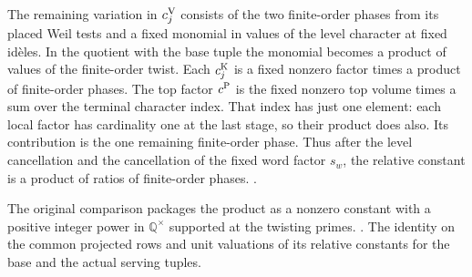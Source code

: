 The remaining variation in \(c^{\rm V}_j\) consists of the
two finite-order phases from its placed Weil tests and a fixed
monomial in values of the level character at fixed id\`eles.
In the quotient with the base tuple the monomial becomes a
product of values of the finite-order twist. Each \(c^{\rm K}_j\)
is a fixed nonzero factor times a product of finite-order
phases. The top factor \(c^{\rm P}\) is the fixed nonzero top
volume times a sum over the terminal character index. That index
has just one element: each local factor has cardinality one at
the last stage, so their product does also. Its contribution is
the one remaining finite-order phase. Thus after the level
cancellation and the cancellation of the fixed word factor \(s_w\),
the relative constant is a product of ratios of finite-order
phases.
.

The original comparison packages the product as a nonzero constant
with a positive integer power in \(\mathbb Q^\times\) supported at
the twisting primes.
.
{The identity on the common projected rows and unit valuations of
its relative constants for the base and the actual serving tuples.}

